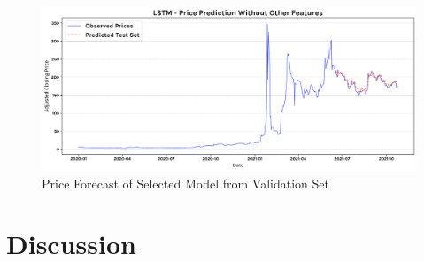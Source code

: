 \documentclass[11pt, a4paper]{article}
\begin{document}
\begin{figure}[!htb]
    \centering
    \includegraphics[scale=0.4]{no_other_feature_pred.png}
    \caption{Price Forecast of Selected Model from Validation Set}
    \label{fig:price_forecast_best_model}
\end{figure}



\section{Discussion}
\end{document}
